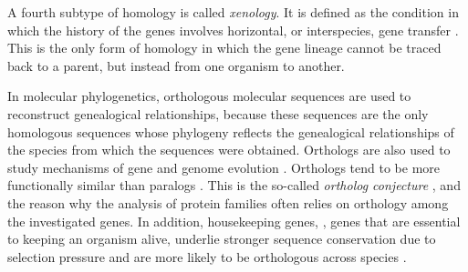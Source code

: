 A fourth subtype of homology is called \emph{xenology}. It is defined as the
condition in which the history of the genes involves horizontal, or
interspecies, gene transfer \citep{gray1983}. This is the only form of homology
in which the gene lineage cannot be traced back to a parent, but instead from
one organism to another.

In molecular phylogenetics, orthologous molecular sequences are used to
reconstruct genealogical relationships, because these sequences are the only
homologous sequences whose phylogeny reflects the genealogical relationships of
the species from which the sequences were obtained. Orthologs are also used to
study mechanisms of gene and genome evolution \citep{dessimoz2012}. Orthologs
tend to be more functionally similar than paralogs \citep{altenhoff2012}. This
is the so-called \emph{ortholog conjecture} \citep{tatusov1997}, and the reason
why the analysis of protein families often relies on orthology among the
investigated genes. In addition, housekeeping genes, \ie, genes that are
essential to keeping an organism alive, underlie stronger sequence conservation
due to selection pressure \citep{she2009} and are more likely to be orthologous
across species \citep{waterhouse2011}. 
